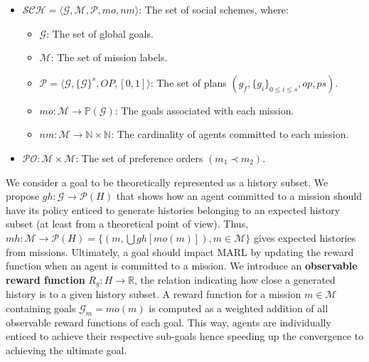 \documentclass[runningheads]{llncs}
\theoremstyle{freethm}
\theoremstyle{proofoutline}
\newcounter{relation}
\begin{document}
\begin{itemize}
    \item $\mathcal{SCH} = \langle \mathcal{G}, \mathcal{M}, \mathcal{P}, mo, nm \rangle$: The set of social schemes, where:
          \begin{itemize}
              \item $\mathcal{G}$: The set of global goals.
              \item $\mathcal{M}$: The set of mission labels.
              \item $\mathcal{P} = \langle \mathcal{G}, \{\mathcal{G}\}^s, OP, [0,1] \rangle$: The set of plans $(g_f, \{g_i\}_{0 \leq i \leq s}, op, ps)$.
              \item $mo: \mathcal{M} \rightarrow \mathbb{P}(\mathcal{G})$: The goals associated with each mission.
              \item $nm: \mathcal{M} \rightarrow \mathbb{N} \times \mathbb{N}$: The cardinality of agents committed to each mission.
          \end{itemize}
    \item $\mathcal{PO}: \mathcal{M} \times \mathcal{M}$: The set of preference orders $(m_1 \prec m_2)$.
\end{itemize}

We consider a goal to be theoretically represented as a history subset. We propose $gh: \mathcal{G} \rightarrow \mathcal{P}(H)$ that shows how an agent committed to a mission should have its policy enticed to generate histories belonging to an expected history subset (at least from a theoretical point of view). Thus, $mh: \mathcal{M} \rightarrow \mathcal{P}(H) = \{(m,\bigcup gh[mo(m)]), m \in \mathcal{M}\}$ gives expected histories from missions. Ultimately, a goal should impact MARL by updating the reward function when an agent is committed to a mission. We introduce an \textbf{observable reward function} $R_{g}: H \rightarrow \mathbb{R}$, the relation indicating how close a generated history is to a given history subset. A reward function for a mission $m \in \mathcal{M}$ containing goals $\mathcal{G}_{m} = mo(m)$ is computed as a weighted addition of all observable reward functions of each goal. This way, agents are individually enticed to achieve their respective sub-goals hence speeding up the convergence to achieving the ultimate goal.

%     
\end{document}
